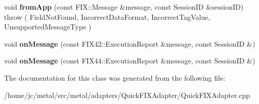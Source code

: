 \begin{DoxyCompactItemize}
\item 
\hypertarget{classMetal_1_1QuickFIX_1_1MyApplication_aca5ad6dbc249cb4093988887224598a6}{}void {\bfseries from\+App} (const F\+I\+X\+::\+Message \&message, const Session\+I\+D \&session\+I\+D)  throw ( Field\+Not\+Found, Incorrect\+Data\+Format, Incorrect\+Tag\+Value, Unsupported\+Message\+Type )\label{classMetal_1_1QuickFIX_1_1MyApplication_aca5ad6dbc249cb4093988887224598a6}

\item 
\hypertarget{classMetal_1_1QuickFIX_1_1MyApplication_a6d513e282a19bbccd0719c39ca5c5dcf}{}void {\bfseries on\+Message} (const F\+I\+X42\+::\+Execution\+Report \&message, const Session\+I\+D \&)\label{classMetal_1_1QuickFIX_1_1MyApplication_a6d513e282a19bbccd0719c39ca5c5dcf}

\item 
\hypertarget{classMetal_1_1QuickFIX_1_1MyApplication_a0bdc162c886f9aa87b481877d990a084}{}void {\bfseries on\+Message} (const F\+I\+X44\+::\+Execution\+Report \&message, const Session\+I\+D \&)\label{classMetal_1_1QuickFIX_1_1MyApplication_a0bdc162c886f9aa87b481877d990a084}

\end{DoxyCompactItemize}


The documentation for this class was generated from the following file\+:\begin{DoxyCompactItemize}
\item 
/home/jc/metal/src/metal/adapters/\+Quick\+F\+I\+X\+Adapter/Quick\+F\+I\+X\+Adapter.\+cpp\end{DoxyCompactItemize}
